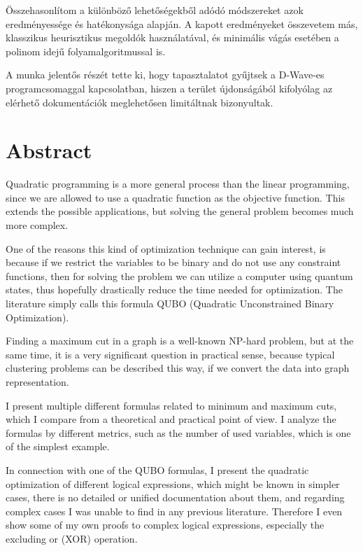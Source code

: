 Összehasonlítom a különböző lehetőségekből adódó módszereket azok eredményessége és hatékonysága alapján.
A kapott eredményeket összevetem más, klasszikus heurisztikus megoldók használatával, és minimális vágás esetében a polinom idejű folyamalgoritmussal is.

A munka jelentős részét tette ki, hogy tapasztalatot gyűjtsek a D-Wave-es programcsomaggal kapcsolatban, hiszen a terület újdonságából kifolyólag az elérhető dokumentációk meglehetősen limitáltnak bizonyultak.

\vfill
\selectenglish



\chapter*{Abstract}

Quadratic programming is a more general process than the linear programming, since we are allowed to use a quadratic function as the objective function. This extends the possible applications, but solving the general problem becomes much more complex.

One of the reasons this kind of optimization technique can gain interest, is because if we restrict the variables to be binary and do not use any constraint functions, then for solving the problem we can utilize a computer using quantum states, thus hopefully drastically reduce the time needed for optimization. The literature simply calls this formula QUBO (Quadratic Unconstrained Binary Optimization).

Finding a maximum cut in a graph is a well-known NP-hard problem, but at the same time, it is a very significant question in practical sense, because typical clustering problems can be described this way, if we convert the data into graph representation.

I present multiple different formulas related to minimum and maximum cuts, which I compare from a theoretical and practical point of view. I analyze the formulas by different metrics, such as the number of used variables, which is one of the simplest example.

In connection with one of the QUBO formulas, I present the quadratic optimization of different logical expressions, which might be known in simpler cases, there is no detailed or unified documentation about them, and regarding complex cases I was unable to find in any previous literature. Therefore I even show some of my own proofs to complex logical expressions, especially the excluding or (XOR) operation.



